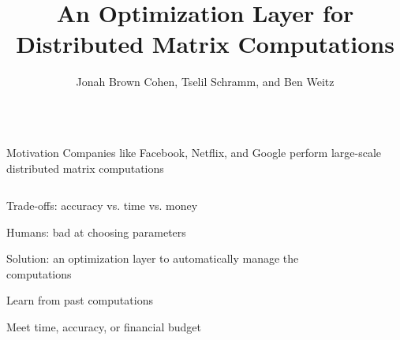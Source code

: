 \documentclass[final]{beamer}
\title[]{{\veryHuge An Optimization Layer for Distributed Matrix Computations }}
\author[]{{\Large Jonah Brown Cohen, Tselil Schramm, and Ben Weitz}}
\date{}
\begin{document}
{\large
  \begin{frame}{} 

\maketitle

\vspace{-1cm}
\begin{center}
\begin{columns}[t]
\begin{column}{0.32\textwidth}


    \begin{block}{\huge Motivation}
\vspace{.5cm}
{\Large Companies like Facebook, Netflix, and Google perform large-scale distributed matrix computations}
\begin{columns}[t]
\begin{column}{0.45\textwidth}
\begin{itemize} {\Large
\item Trade-offs: accuracy vs. time vs. money
\item Humans: bad at choosing parameters
\item Solution: an optimization layer to automatically manage the computations
\item Learn from past computations
\item Meet time, accuracy, or financial budget
}
\end{itemize}
\end{column}
\begin{column}{0.45\textwidth}
\begin{center}
\begin{figure}
\end{figure}
\end{center}
\end{column}
\end{columns}
\end{block}
\end{column}
\end{columns}
\end{center}
\end{frame}}
\end{document}
